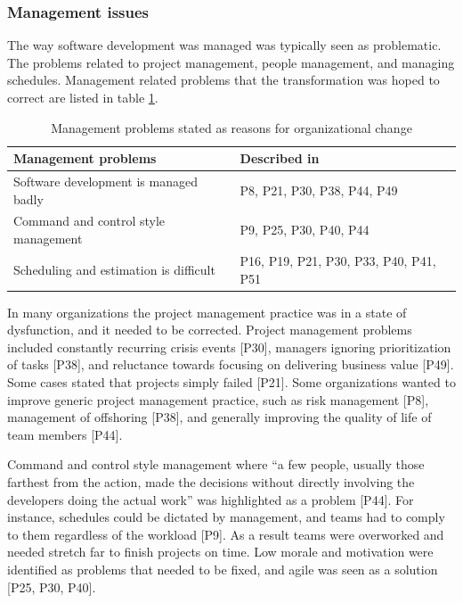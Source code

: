 \documentclass[preprint,authoryear,12pt]{elsarticle}
\begin{document}
\subsubsection{Management issues}

The way software development was managed was typically seen as problematic. The
problems related to project management, people management, and managing
schedules. Management related problems that the transformation was hoped to
correct are listed in table \ref{table:reasonstochange_management}.

\begin{table}[b]
    \centering
    \begin{tabular}{ >{\raggedright\arraybackslash}p{}
                     >{\raggedright\arraybackslash}p{} }
        \toprule
        Management problems           &  Described in  \\
        \midrule
        Software development is managed badly   &  P8, P21, P30, P38, P44, P49  \\
        Command and control style management    &  P9, P25, P30, P40, P44  \\
        Scheduling and estimation is difficult  &  P16, P19, P21, P30, P33, P40, P41, P51  \\
        \bottomrule
    \end{tabular}
    \caption{Management problems stated as reasons for organizational change}
    \label{table:reasonstochange_management}
\end{table}

In many organizations the project management practice was in a state of
dysfunction, and it needed to be corrected. Project management problems included
constantly recurring crisis events [P30], managers ignoring prioritization of
tasks [P38], and reluctance towards focusing on delivering business value [P49].
Some cases stated that projects simply failed [P21]. Some organizations wanted
to improve generic project management practice, such as risk management [P8],
management of offshoring [P38], and generally improving the quality of life of
team members [P44].

Command and control style management where ``a few people, usually those
farthest from the action, made the decisions without directly involving the
developers doing the actual work'' was highlighted as a problem [P44]. For
instance, schedules could be dictated by management, and teams had to comply to
them regardless of the workload [P9]. As a result teams were overworked and
needed stretch far to finish projects on time. Low morale and motivation were
identified as problems that needed to be fixed, and agile was seen as a solution
[P25, P30, P40].
\end{document}
